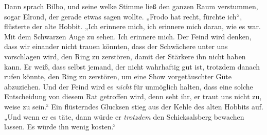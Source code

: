 Dann sprach Bilbo, und seine welke Stimme ließ den ganzen Raum verstummen, sogar Elrond, der gerade etwas sagen wollte.
„Frodo hat recht, fürchte ich“, flüsterte der alte Hobbit.
„Ich erinnere mich, ich erinnere mich daran, wie es war. Mit dem Schwarzen Auge zu sehen. Ich erinnere mich. Der Feind wird denken, dass wir einander nicht trauen könnten, dass der Schwächere unter uns vorschlagen wird, den Ring zu zerstören, damit der Stärkere ihn nicht haben kann. Er weiß, dass selbst jemand, der nicht wahrhaftig gut ist, trotzdem danach rufen könnte, den Ring zu zerstören, um eine Show vorgetäuschter Güte abzuziehen. Und der Feind wird es \emph{nicht} für unmöglich halten, dass eine solche Entscheidung von diesem Rat getroffen wird, denn seht ihr, er traut uns nicht zu, weise zu sein.“ Ein flüsterndes Glucksen stieg aus der Kehle des alten Hobbits auf.
„Und wenn er es täte, dann würde er \emph{trotzdem} den Schicksalsberg bewachen lassen. Es würde ihn wenig kosten.“

